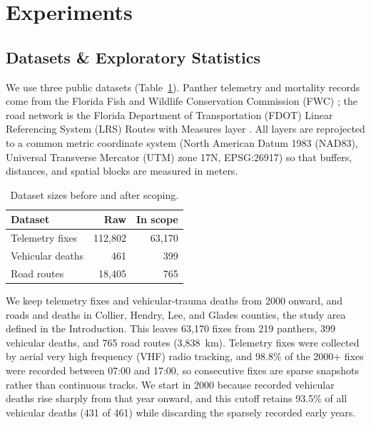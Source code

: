 \section{Experiments}

\subsection{Datasets \& Exploratory Statistics}
We use three public datasets (Table~\ref{tab:data}). Panther telemetry and mortality records come from the Florida Fish and Wildlife Conservation Commission (FWC) \cite{FWCPantherTelemetry,FWCPantherMortality}; the road network is the Florida Department of Transportation (FDOT) Linear Referencing System (LRS) Routes with Measures layer \cite{FDOTLRS}. All layers are reprojected to a common metric coordinate system (North American Datum 1983 (NAD83), Universal Transverse Mercator (UTM) zone 17N, EPSG:26917) so that buffers, distances, and spatial blocks are measured in meters.

\begin{table}[t]
\centering
\small
\begin{tabular}{lrr}
\hline
\textbf{Dataset} & \textbf{Raw} & \textbf{In scope} \\
\hline
Telemetry fixes & 112{,}802 & 63{,}170 \\
Vehicular deaths & 461 & 399 \\
Road routes & 18{,}405 & 765 \\
\hline
\end{tabular}
\caption{Dataset sizes before and after scoping.}
\label{tab:data}
\end{table}

We keep telemetry fixes and vehicular-trauma deaths from 2000 onward, and roads and deaths in Collier, Hendry, Lee, and Glades counties, the study area defined in the Introduction. This leaves 63{,}170 fixes from 219 panthers, 399 vehicular deaths, and 765 road routes (3{,}838~km). Telemetry fixes were collected by aerial very high frequency (VHF) radio tracking, and 98.8\% of the 2000+ fixes were recorded between 07:00 and 17:00, so consecutive fixes are sparse snapshots rather than continuous tracks. We start in 2000 because recorded vehicular deaths rise sharply from that year onward, and this cutoff retains 93.5\% of all vehicular deaths (431 of 461) while discarding the sparsely recorded early years.


